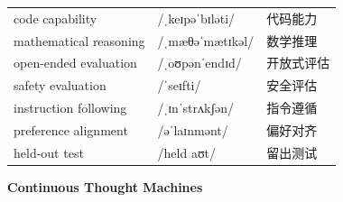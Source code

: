 \documentclass[UTF8,12pt,a4paper]{ctexart}
\providecommand{\zh}[1]{#1}
\begin{document}
\begin{tabular*}{\textwidth}{@{\extracolsep{\fill}}lll@{}}
code capability & {\ipafont /ˌkeɪpəˈbɪləti/} & \zh{代码能力} \\
mathematical reasoning & {\ipafont /ˌmæθəˈmætɪkəl/} & \zh{数学推理} \\
open-ended evaluation & {\ipafont /ˌoʊpənˈendɪd/} & \zh{开放式评估} \\
safety evaluation & {\ipafont /ˈseɪfti/} & \zh{安全评估} \\
instruction following & {\ipafont /ˌɪnˈstrʌkʃən/} & \zh{指令遵循} \\
preference alignment & {\ipafont /əˈlaɪnmənt/} & \zh{偏好对齐} \\
held-out test & {\ipafont /held aʊt/} & \zh{留出测试} \\
\bottomrule
\end{tabular*}

\newpage

\begin{center}
    {\Large\bfseries Continuous Thought Machines}
\end{center}
\end{document}
